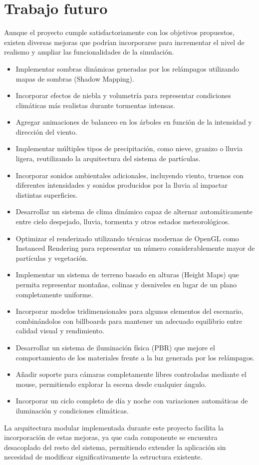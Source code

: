 \chapter{Trabajo futuro}

Aunque el proyecto cumple satisfactoriamente con los objetivos propuestos, existen diversas mejoras que podrían incorporarse para incrementar el nivel de realismo y ampliar las funcionalidades de la simulación.

\begin{itemize}

\item Implementar sombras dinámicas generadas por los relámpagos utilizando mapas de sombras (Shadow Mapping).

\item Incorporar efectos de niebla y volumetría para representar condiciones climáticas más realistas durante tormentas intensas.

\item Agregar animaciones de balanceo en los árboles en función de la intensidad y dirección del viento.

\item Implementar múltiples tipos de precipitación, como nieve, granizo o lluvia ligera, reutilizando la arquitectura del sistema de partículas.

\item Incorporar sonidos ambientales adicionales, incluyendo viento, truenos con diferentes intensidades y sonidos producidos por la lluvia al impactar distintas superficies.

\item Desarrollar un sistema de clima dinámico capaz de alternar automáticamente entre cielo despejado, lluvia, tormenta y otros estados meteorológicos.

\item Optimizar el renderizado utilizando técnicas modernas de OpenGL como Instanced Rendering para representar un número considerablemente mayor de partículas y vegetación.

\item Implementar un sistema de terreno basado en alturas (Height Maps) que permita representar montañas, colinas y desniveles en lugar de un plano completamente uniforme.

\item Incorporar modelos tridimensionales para algunos elementos del escenario, combinándolos con billboards para mantener un adecuado equilibrio entre calidad visual y rendimiento.

\item Desarrollar un sistema de iluminación física (PBR) que mejore el comportamiento de los materiales frente a la luz generada por los relámpagos.

\item Añadir soporte para cámaras completamente libres controladas mediante el mouse, permitiendo explorar la escena desde cualquier ángulo.

\item Incorporar un ciclo completo de día y noche con variaciones automáticas de iluminación y condiciones climáticas.

\end{itemize}

La arquitectura modular implementada durante este proyecto facilita la incorporación de estas mejoras, ya que cada componente se encuentra desacoplado del resto del sistema, permitiendo extender la aplicación sin necesidad de modificar significativamente la estructura existente.